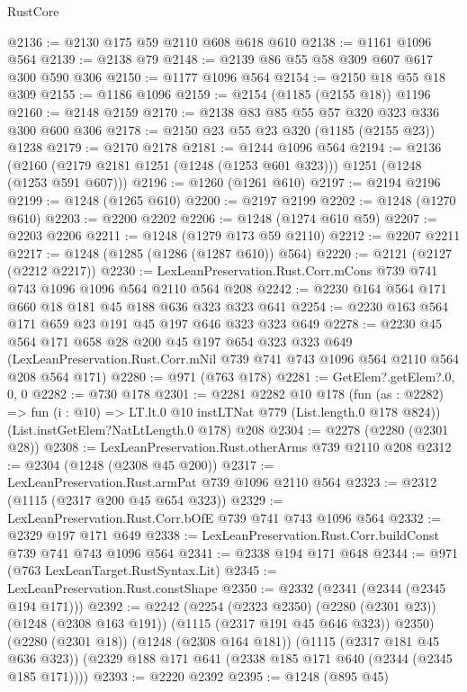 \begin{lexlean}{RustCore}
\begin{coremodule}
@2136 := @2130 @175 @59 @2110 @608 @618 @610
@2138 := @1161 @1096 @564
@2139 := @2138 @79
@2148 := @2139 @86 @55 @58 @309 @607 @617 @300 @590 @306
@2150 := @1177 @1096 @564
@2154 := @2150 @18 @55 @18 @309
@2155 := @1186 @1096
@2159 := @2154 (@1185 (@2155 @18)) @1196
@2160 := @2148 @2159
@2170 := @2138 @83 @85 @55 @57 @320 @323 @336 @300 @600 @306
@2178 := @2150 @23 @55 @23 @320 (@1185 (@2155 @23)) @1238
@2179 := @2170 @2178
@2181 := @1244 @1096 @564
@2194 := @2136 (@2160 (@2179 @2181 @1251 (@1248 (@1253 @601 @323))) @1251 (@1248 (@1253 @591 @607)))
@2196 := @1260 (@1261 @610)
@2197 := @2194 @2196
@2199 := @1248 (@1265 @610)
@2200 := @2197 @2199
@2202 := @1248 (@1270 @610)
@2203 := @2200 @2202
@2206 := @1248 (@1274 @610 @59)
@2207 := @2203 @2206
@2211 := @1248 (@1279 @173 @59 @2110)
@2212 := @2207 @2211
@2217 := @1248 (@1285 (@1286 (@1287 @610)) @564)
@2220 := @2121 (@2127 (@2212 @2217))
@2230 := LexLeanPreservation.Rust.Corr.mCons @739 @741 @743 @1096 @1096 @564 @2110 @564 @208
@2242 := @2230 @164 @564 @171 @660 @18 @181 @45 @188 @636 @323 @323 @641
@2254 := @2230 @163 @564 @171 @659 @23 @191 @45 @197 @646 @323 @323 @649
@2278 := @2230
    @45
    @564
    @171
    @658
    @28
    @200
    @45
    @197
    @654
    @323
    @323
    @649
    (LexLeanPreservation.Rust.Corr.mNil @739 @741 @743 @1096 @564 @2110 @564 @208 @564 @171)
@2280 := @971 (@763 @178)
@2281 := GetElem?.getElem?.{0, 0, 0}
@2282 := @730 @178
@2301 := @2281
    @2282
    @10
    @178
    (fun (as : @2282) => fun (i : @10) => LT.lt.{0} @10 instLTNat @779 (List.length.{0} @178 @824))
    (List.instGetElem?NatLtLength.{0} @178)
    @208
@2304 := @2278 (@2280 (@2301 @28))
@2308 := LexLeanPreservation.Rust.otherArms @739 @2110 @208
@2312 := @2304 (@1248 (@2308 @45 @200))
@2317 := LexLeanPreservation.Rust.armPat @739 @1096 @2110 @564
@2323 := @2312 (@1115 (@2317 @200 @45 @654 @323))
@2329 := LexLeanPreservation.Rust.Corr.bOfE @739 @741 @743 @1096 @564
@2332 := @2329 @197 @171 @649
@2338 := LexLeanPreservation.Rust.Corr.buildConst @739 @741 @743 @1096 @564
@2341 := @2338 @194 @171 @648
@2344 := @971 (@763 LexLeanTarget.RustSyntax.Lit)
@2345 := LexLeanPreservation.Rust.constShape
@2350 := @2332 (@2341 (@2344 (@2345 @194 @171)))
@2392 := @2242
    (@2254
      (@2323 @2350)
      (@2280 (@2301 @23))
      (@1248 (@2308 @163 @191))
      (@1115 (@2317 @191 @45 @646 @323))
      @2350)
    (@2280 (@2301 @18))
    (@1248 (@2308 @164 @181))
    (@1115 (@2317 @181 @45 @636 @323))
    (@2329 @188 @171 @641 (@2338 @185 @171 @640 (@2344 (@2345 @185 @171))))
@2393 := @2220 @2392
@2395 := @1248 (@895 @45)

\end{coremodule}
\end{lexlean}
